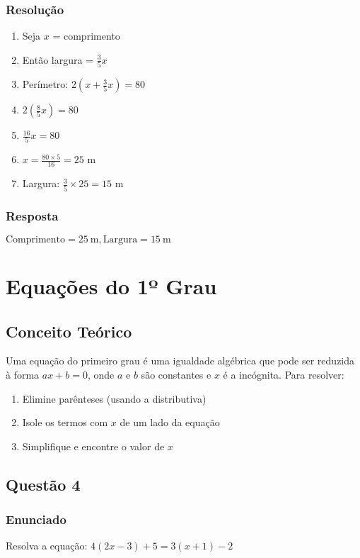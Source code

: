 \documentclass[11pt]{article}
\begin{document}
\subsubsection*{Resolução}
\begin{enumerate}
\item Seja $x$ = comprimento
\item Então largura = $\frac{3}{5}x$
\item Perímetro: $2(x + \frac{3}{5}x) = 80$
\item $2(\frac{8}{5}x) = 80$
\item $\frac{16}{5}x = 80$
\item $x = \frac{80 \times 5}{16} = 25$ m
\item Largura: $\frac{3}{5} \times 25 = 15$ m
\end{enumerate}

\subsubsection*{Resposta}
$\boxed{\text{Comprimento} = 25\ \text{m}, \text{Largura} = 15\ \text{m}}$

\section{Equações do 1º Grau}

\subsection{Conceito Teórico}
Uma equação do primeiro grau é uma igualdade algébrica que pode ser reduzida à forma $ax + b = 0$, onde $a$ e $b$ são constantes e $x$ é a incógnita. Para resolver:
\begin{enumerate}
\item Elimine parênteses (usando a distributiva)
\item Isole os termos com $x$ de um lado da equação
\item Simplifique e encontre o valor de $x$
\end{enumerate}

\subsection{Questão 4}
\subsubsection*{Enunciado}
Resolva a equação: $4(2x - 3) + 5 = 3(x + 1) - 2$
\end{document}
